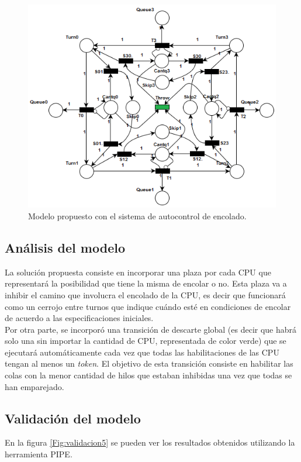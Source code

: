 \documentclass[a4paper]{book}
\begin{document}
\begin{figure} [H]
	\begin{center}
	    \includegraphics[scale=0.9]{./imagenes/it5modelored.png}
		\caption{Modelo propuesto con el sistema de autocontrol de encolado.}
	\end{center}
\end{figure}

\subsection{An\'alisis del modelo}
La solución propuesta consiste en incorporar una plaza por cada CPU que representar\'a la posibilidad que tiene la misma de encolar o no. Esta plaza va a inhibir el camino que involucra el encolado de la CPU, es decir que funcionar\'a como un cerrojo entre turnos que indique cuándo esté en condiciones de encolar de acuerdo a las especificaciones iniciales.\\

Por otra parte, se incorpor\'o una transici\'on de descarte global (es decir que habr\'a solo una sin importar la cantidad de CPU, representada de color verde) que se ejecutar\'a autom\'aticamente cada vez que todas las habilitaciones de las CPU tengan al menos un \emph{token}. El objetivo de esta transici\'on consiste en habilitar las colas con la menor cantidad de hilos que estaban inhibidas una vez que todas se han emparejado.

\subsection{Validaci\'on del modelo}
En la figura \ref{Fig:validacion5} se pueden ver los resultados obtenidos utilizando la herramienta PIPE.
\end{document}
